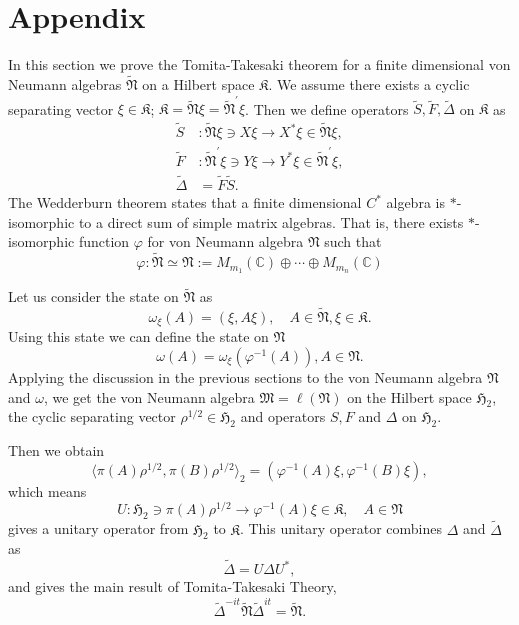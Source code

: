 \section{Appendix}
In this section we prove the Tomita-Takesaki theorem for a finite dimensional
von Neumann algebras $\tilde{\mathfrak{N}}$ on a Hilbert space $\mathfrak{K}$.
We assume there exists a cyclic separating vector $\xi\in \mathfrak{K}$;
$\mathfrak{K}=\tilde{\mathfrak{N}}\xi=\tilde{\mathfrak{N}}^\prime\xi$.
Then we define operators $\tilde{S},\tilde{F},\tilde{\Delta}$ on $\mathfrak{K}$ as
\begin{equation}
\begin{split}
\tilde{S}&:\tilde{\mathfrak{N}}\xi\ni X\xi \to X^\ast \xi \in \tilde{\mathfrak{N}}\xi,\\
\tilde{F}&:\tilde{\mathfrak{N}}^\prime\xi\ni Y\xi \to Y^\ast \xi \in \tilde{\mathfrak{N}}^\prime\xi,\\
\tilde{\Delta}&=\tilde{F}\tilde{S}.
\end{split}
\end{equation}
The Wedderburn theorem states that a finite dimensional $C^{\ast}$ algebra is  $\ast$-isomorphic to a direct sum of simple matrix algebras. That is, there exists $\ast$-isomorphic function $\varphi$ for von Neumann algebra $\mathfrak{N}$ such that
$$
\varphi:\tilde{\mathfrak{N}}\simeq \mathfrak{N}:=M_{m_1}(\mathbb{C})\oplus \cdots \oplus M_{m_n}(\mathbb{C})
$$

Let us consider the state on $\tilde{\mathfrak{N}}$ as
$$
\omega_\xi(A)=(\xi,A\xi),\quad A\in \tilde{\mathfrak{N}},\xi\in \mathfrak{K}.
$$
Using this state we can define the state on $\mathfrak{N}$
$$
\omega(A)=\omega_\xi(\varphi^{-1}(A)),A\in \mathfrak{N}.
$$
Applying the discussion in the previous sections to the von Neumann algebra $\mathfrak{N}$ and 
$\omega$, we get
the von Neumann algebra $\mathfrak{M}=\ell (\mathfrak{N})$ on the Hilbert space 
$\mathfrak{H}_2$, the cyclic separating vector $\rho^{1/2}\in \mathfrak{H}_2$
and operators $S, F$ and $\Delta$ on $\mathfrak{H}_2$.

Then we obtain
$$
\langle \pi(A)\rho^{1/2},\pi( B)\rho^{1/2}\rangle_2=(\varphi^{-1}(A)\xi,\varphi^{-1}(B)\xi),
$$
which means
$$
U:\mathfrak{H}_2\ni\pi(A)\rho^{1/2}\to \varphi^{-1}(A)\xi\in\mathfrak{K}, \quad A\in \mathfrak{N}
$$
gives a unitary operator from $\mathfrak{H}_2$ to $\mathfrak{K}$.
This unitary operator combines $\Delta$ and $\tilde{\Delta}$ as
$$
\tilde{\Delta}=U\Delta U^{\ast},
$$
and gives the main result of Tomita-Takesaki Theory,
$$
\tilde{\Delta}^{-it}\tilde{\mathfrak{N}}\tilde{\Delta}^{it}=\tilde{\mathfrak{N}}.
$$



